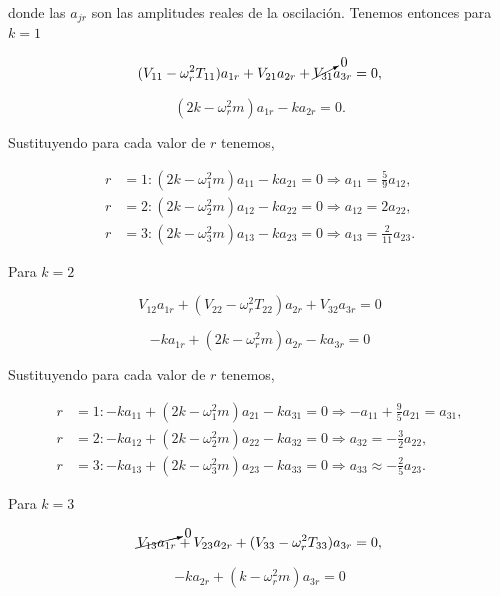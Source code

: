 \documentclass[a4paper,10pt]{article}
\numberwithin{equation}{section}
\begin{document}
donde las $a_{jr}$ son las amplitudes reales de la oscilación. Tenemos entonces 
para $k = 1$ 

\begin{equation}
 (V_{11} - \omega_r^2T_{11})a_{1r} + V_{21}a_{2r} + \cancelto{0}{V_{31}}a_{3r} = 0,
\end{equation}

\begin{equation}
 (2k - \omega_r^2m)a_{1r} - ka_{2r} = 0.
\end{equation}

Sustituyendo para cada valor de $r$ tenemos, 

\begin{align}
 r &= 1: (2k - \omega_1^2m)a_{11} - ka_{21} = 0 \Rightarrow a_{11} = \frac{5}{9}a_{12}, \\
 r &= 2: (2k - \omega_2^2m)a_{12} - ka_{22} = 0 \Rightarrow a_{12} = 2a_{22}, \\
 r &= 3: (2k - \omega_3^2m)a_{13} - ka_{23} = 0 \Rightarrow a_{13} = \frac{2}{11}a_{23}.
\end{align}

Para $k=2$

\begin{equation}
 V_{12}a_{1r} + (V_{22} - \omega_r^2T_{22})a_{2r} + V_{32}a_{3r} = 0
\end{equation}


\begin{equation}
 -ka_{1r} + (2k - \omega_r^2m)a_{2r} -k a_{3r} = 0
\end{equation}

Sustituyendo para cada valor de $r$ tenemos,

\begin{align}
 r &= 1: -ka_{11} + (2k - \omega_1^2m)a_{21} -k a_{31}  = 0 \Rightarrow 
 -a_{11} + \frac{9}{5}a_{21} = a_{31}, \\
 r &= 2: -ka_{12} + (2k - \omega_2^2m)a_{22} -k a_{32}  = 0 \Rightarrow 
 a_{32} = - \frac{3}{2}a_{22}, \\
 r &= 3: -ka_{13} + (2k - \omega_3^2m)a_{23} -k a_{33}  = 0 \Rightarrow 
 a_{33} \approx - \frac{2}{5} a_{23}.
\end{align}

Para $k=3$

\begin{equation}
 \cancelto{0}{V_{13}a_{1r}} + V_{23}a_{2r} + (V_{33} - \omega_r^2T_{33})a_{3r} = 0,
\end{equation}

\begin{equation}
 -ka_{2r} + (k - \omega_r^2m)a_{3r} = 0
\end{equation}
\end{document}
